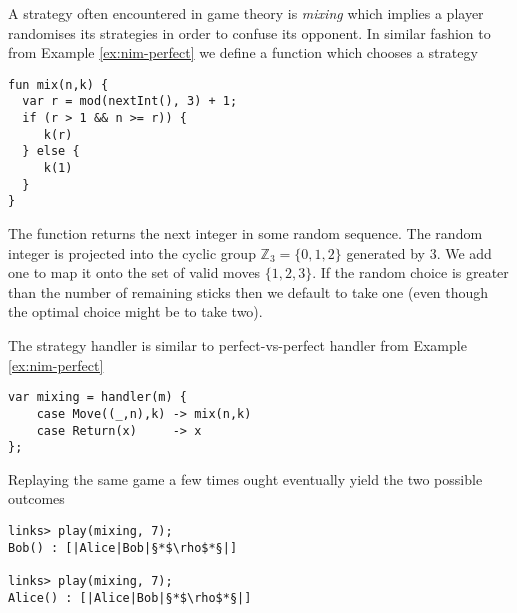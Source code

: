 \begin{example}\label{ex:nim-mixing}
A strategy often encountered in game theory is \emph{mixing} which implies a player randomises its strategies in order to confuse its opponent. In similar fashion to  from Example \ref{ex:nim-perfect} we define a function  which chooses a strategy
\begin{lstlisting}[style=links]
fun mix(n,k) {
  var r = mod(nextInt(), 3) + 1;
  if (r > 1 && n >= r)) {
     k(r)
  } else {
     k(1)
  }
}
\end{lstlisting}
The function  returns the next integer in some random sequence. The random integer is projected into the cyclic group $\mathbb{Z}_3 = \{0,1,2\}$ generated by $3$. We add one to map it onto the set of valid moves $\{1,2,3\}$. If the random choice  is greater than the number of remaining sticks  then we default to take one (even though the optimal choice might be to take two).

The  strategy handler is similar to perfect-vs-perfect handler from Example \ref{ex:nim-perfect}
\begin{lstlisting}[style=links]
var mixing = handler(m) {
    case Move((_,n),k) -> mix(n,k)
    case Return(x)     -> x			  
};
\end{lstlisting}
Replaying the same game a few times ought eventually yield the two possible outcomes
\begin{lstlisting}
links> play(mixing, 7);
Bob() : [|Alice|Bob|§*$\rho$*§|]

links> play(mixing, 7);
Alice() : [|Alice|Bob|§*$\rho$*§|]
\end{lstlisting}
\end{example}

